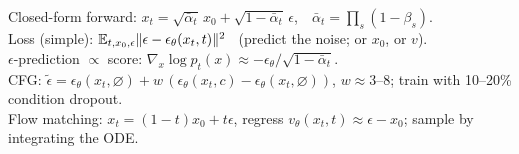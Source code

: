 \begin{mem}
Closed-form forward: $x_t=\sqrt{\bar\alpha_t}\,x_0+\sqrt{1-\bar\alpha_t}\,\epsilon$,\ \ $\bar\alpha_t=\prod_s(1-\beta_s)$.\\
Loss (simple): $\mathbb{E}_{t,x_0,\epsilon}\|\epsilon-\epsilon_\theta(x_t,t)\|^2$ \ (predict the noise; or $x_0$, or $v$).\\
$\epsilon$-prediction $\propto$ score: $\nabla_x\log p_t(x)\approx-\epsilon_\theta/\sqrt{1-\bar\alpha_t}$.\\
CFG: $\tilde\epsilon=\epsilon_\theta(x_t,\varnothing)+w\,(\epsilon_\theta(x_t,c)-\epsilon_\theta(x_t,\varnothing))$, $w\approx3$--$8$; train with 10--20\% condition dropout.\\
Flow matching: $x_t=(1-t)x_0+t\epsilon$, regress $v_\theta(x_t,t)\approx\epsilon-x_0$; sample by integrating the ODE.
\end{mem}

